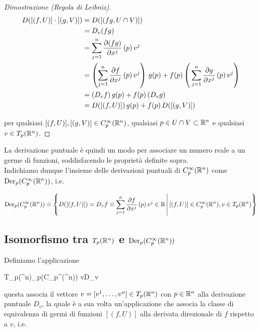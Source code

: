 \begin{proof}[Dimostrazione (Regola di Leibniz)]
	\begin{align}
		\begin{split}
			D ([(f,U)] \cdot [(g,V)]) &= D ([(f g,U \cap V)]) \\
			&= D_{v} (f g) \\
			&= \sum_{j=1}^{n} \pdv{(f g)}{x^{j}} \, (p) \, v^{j} \\
			&= \left( \sum_{j=1}^{n} \pdv{f}{x^{j}} \, (p) \, v^{j} \right) \, g(p) + f(p) \left( \, \sum_{j=1}^{n} \pdv{g}{x^{j}} \, (p) \, v^{j} \right) \\
			&= (D_{v} f) \, g(p) + f(p) \, (D_{v} g) \\
			&= D ([(f,U)]) \, g(p) + f(p) \, D ([(g,V)])
		\end{split}
	\end{align}

	per qualsiasi $ [(f,U)], [(g,V)] \in C_{p}^{\infty}(\mathbb{R}^{n}) $, qualsiasi $ p \in U \cap V \subset \mathbb{R}^{n} $ e qualsiasi $ v \in T_{p} (\mathbb{R}^{n}) $.
\end{proof}

La derivazione puntuale è quindi un modo per associare un numero reale a un germe di funzioni, soddisfacendo le proprietà definite sopra. \\
Indichiamo dunque l'insieme delle derivazioni puntuali di $ C_{p}^{\infty}(\mathbb{R}^{n}) $ come $ \operatorname{Der}_{p}(C_{p}^{\infty}(\mathbb{R}^{n})) $, i.e.

\begin{equation}
	\operatorname{Der}_{p}(C_{p}^{\infty}(\mathbb{R}^{n})) \doteq \left\{ D ([(f,U)]) = D_{v} f \doteq \sum_{j=1}^{n} \pdv{f}{x^{j}} \, (p) \, v^{j} \in \mathbb{R} \, \middle| \, [(f,U)] \in C_{p}^{\infty}(\mathbb{R}^{n}), v \in T_{p} (\mathbb{R}^{n}) \right\}
\end{equation}

\subsection{Isomorfismo tra $ T_{p}(\mathbb{R}^{n}) $ e $ \operatorname{Der}_{p}(C_{p}^{\infty}(\mathbb{R}^{n})) $}

Definiamo l'applicazione

\map{\varphi}
	{T_{p}(\R^{n})}{\der_{p}(C_{p}^{\infty}(\R^{n}))}
	{v}{D_{v}}

questa associa il vettore $ v = [v^{1},\dots,v^{n}] \in T_{p}(\mathbb{R}^{n}) $ con $ p \in \mathbb{R}^{n} $ alla derivazione puntuale $ D_{v} $, la quale è a sua volta un'applicazione che associa la classe di equivalenza di germi di funzioni $ [(f,U)] $ alla derivata direzionale di $ f $ rispetto a $ v $, i.e.


